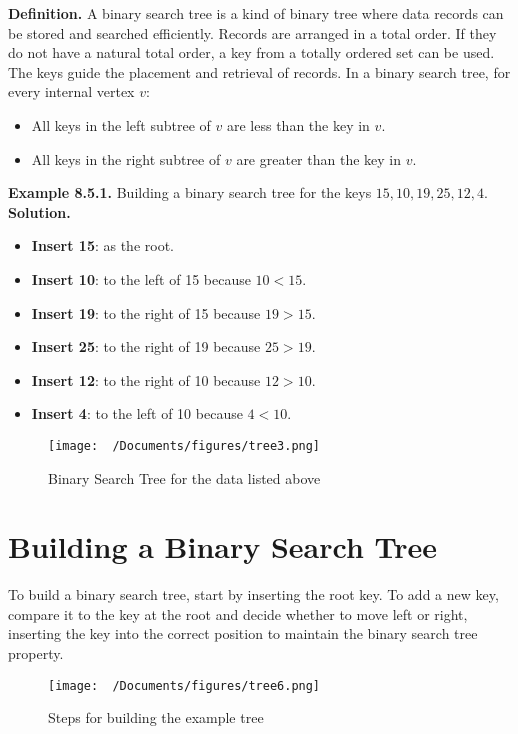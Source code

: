 \documentclass{report}
\begin{document}
\textbf{Definition.} A binary search tree is a kind of binary tree where data records can be stored and searched efficiently. Records are arranged in a total order. If they do not have a natural total order, a key from a totally ordered set can be used. The keys guide the placement and retrieval of records.
\bigbreak \noindent
\noindent In a binary search tree, for every internal vertex \( v \):
\begin{itemize}
    \item All keys in the left subtree of \( v \) are less than the key in \( v \).
    \item All keys in the right subtree of \( v \) are greater than the key in \( v \).
\end{itemize}
\bigbreak \noindent
\textbf{Example 8.5.1.} Building a binary search tree for the keys \( 15, 10, 19, 25, 12, 4 \).
\bigbreak \noindent
\textbf{Solution.} 
\begin{itemize}
    \item \textbf{Insert 15}: as the root.
    \item \textbf{Insert 10}: to the left of 15 because \( 10 < 15 \).
    \item \textbf{Insert 19}: to the right of 15 because \( 19 > 15 \).
    \item \textbf{Insert 25}: to the right of 19 because \( 25 > 19 \).
    \item \textbf{Insert 12}: to the right of 10 because \( 12 > 10 \).
    \item \textbf{Insert 4}: to the left of 10 because \( 4 < 10 \).
\end{itemize}

\begin{figure}[ht]
    \centering
    \texttt{[image: ~/Documents/figures/tree3.png]}
    \caption{Binary Search Tree for the data listed above}
\end{figure}

\section*{Building a Binary Search Tree}

To build a binary search tree, start by inserting the root key. To add a new key, compare it to the key at the root and decide whether to move left or right, inserting the key into the correct position to maintain the binary search tree property.

\begin{figure}[ht]
    \centering
    \texttt{[image: ~/Documents/figures/tree6.png]}
    \caption{Steps for building the example tree}
\end{figure}
\bigbreak \noindent
\end{document}
